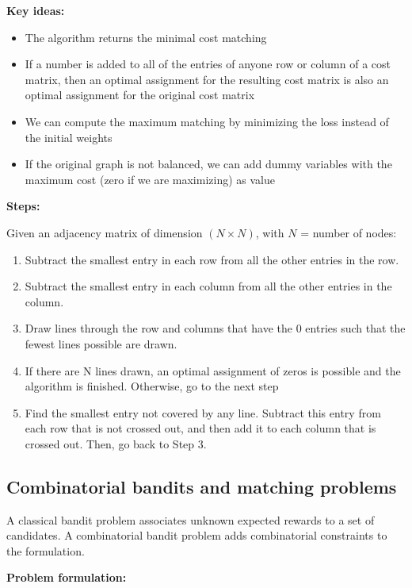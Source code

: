 \documentclass[10pt,a4paper]{article}
\begin{document}
\textbf{Key ideas:}

\begin{itemize}
\item The algorithm returns the minimal cost matching
\item If a number is added to all of the entries of anyone row or column of a cost matrix, then an optimal assignment for the resulting cost matrix is also an optimal assignment for the original cost matrix
\item We can compute the maximum matching by minimizing the loss instead of the initial weights
\item If the original graph is not balanced, we can add dummy variables with the maximum cost (zero if we are maximizing) as value
\end{itemize}

\textbf{Steps:}

Given an adjacency matrix of dimension $(N \times N)$, with $N$ = number of nodes:

\begin{enumerate}
\item Subtract the smallest entry in each row from all the other entries in the row.
\item Subtract the smallest entry in each column from all the other entries in the column.
\item Draw lines through the row and columns that have the 0 entries such that the fewest lines possible are drawn.
\item If there are N lines drawn, an optimal assignment of zeros is possible and the algorithm is finished. Otherwise, go to the next step
\item Find the smallest entry not covered by any line. Subtract this entry from each row that is not crossed out, and then add it to each column that is crossed out. Then, go back to Step 3.
\end{enumerate}

\subsection{Combinatorial bandits and matching problems}\label{combinatorial-bandits-and-matching-problems}

A classical bandit problem associates unknown expected rewards to a set of candidates. A combinatorial bandit problem adds combinatorial constraints to the formulation.

\textbf{Problem formulation:}
\end{document}
